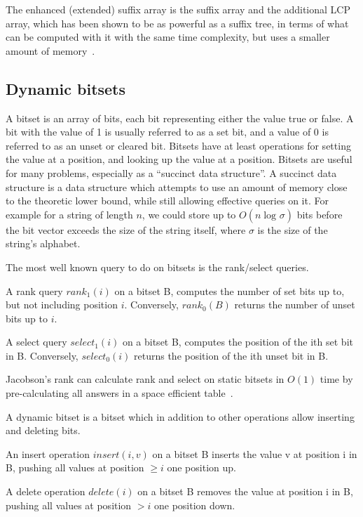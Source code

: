 The enhanced (extended) suffix array is the suffix array and the additional LCP array,
which has been shown to be as powerful as a suffix tree, in terms of what can be computed
with it with the same time complexity, but uses a smaller amount of
memory~\cite{ReplaceSuffixTreeWithEnchancedSuffixArray}.

 \subsection*{Dynamic bitsets}

A bitset is an array of bits, each bit representing either the value true or false. A bit
with the value of 1 is usually referred to as a set bit, and a value of 0 is referred to
as an unset or cleared bit. Bitsets have at least operations for setting the value at a
position, and looking up the value at a position. Bitsets are useful for many problems,
especially as a ``succinct data structure''. A succinct data structure is a data structure
which attempts to use an amount of memory close to the theoretic lower bound, while still
allowing effective queries on it. For example for a string of length $n$, we could store
up to $O(n \log_{}\sigma)$ bits before the bit vector exceeds the size of the string
itself, where $\sigma$ is the size of the string's alphabet.

The most well known query to do on bitsets is the rank/select queries.

\begin{definition}

    A rank query $rank_1(i)$ on a bitset B, computes the number of set bits
    up to, but not including position $i$. Conversely, $rank_0(B)$ returns the number of
    unset bits up to $i$.

\end{definition}
\begin{definition}
    
    A select query $select_1(i)$ on a bitset B, computes the position of the ith
    set bit in B. Conversely, $select_0(i)$ returns the position of the ith unset bit in
    B.

\end{definition}

Jacobson's rank can calculate rank and select on static bitsets in $O(1)$ time by
pre-calculating all answers in a space efficient table~\cite{JacobsonsRank}.

\begin{definition}

    A dynamic bitset is a bitset which in addition to other operations allow inserting and
    deleting bits.

    An insert operation $insert(i, v)$ on a bitset B inserts the value v at position i in
    B, pushing all values at position $\geq i$ one position up.

    A delete operation $delete(i)$ on a bitset B removes the value at position i in B, pushing all
    values at position $> i$ one position down.

\end{definition}

